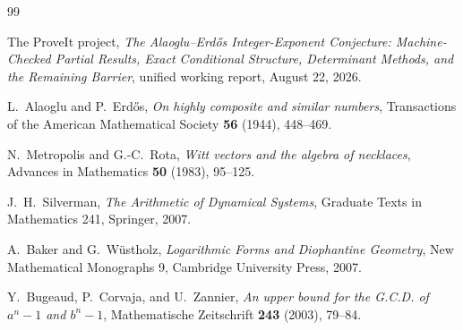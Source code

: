 \documentclass[11pt,oneside]{article}
\theoremstyle{definition}
\theoremstyle{remark}
\begin{document}
\begin{thebibliography}{99}

The ProveIt project,
\newblock \emph{The Alaoglu--Erd\H{o}s Integer-Exponent Conjecture: Machine-Checked Partial
Results, Exact Conditional Structure, Determinant Methods, and the Remaining Barrier},
\newblock unified working report, August 22, 2026.

L.~Alaoglu and P.~Erd\H{o}s,
\newblock \emph{On highly composite and similar numbers},
\newblock Transactions of the American Mathematical Society \textbf{56} (1944), 448--469.

N.~Metropolis and G.-C.~Rota,
\newblock \emph{Witt vectors and the algebra of necklaces},
\newblock Advances in Mathematics \textbf{50} (1983), 95--125.

J.~H.~Silverman,
\newblock \emph{The Arithmetic of Dynamical Systems},
\newblock Graduate Texts in Mathematics 241, Springer, 2007.

A.~Baker and G.~W\"ustholz,
\newblock \emph{Logarithmic Forms and Diophantine Geometry},
\newblock New Mathematical Monographs 9, Cambridge University Press, 2007.

Y.~Bugeaud, P.~Corvaja, and U.~Zannier,
\newblock \emph{An upper bound for the G.C.D. of \(a^n-1\) and \(b^n-1\)},
\newblock Mathematische Zeitschrift \textbf{243} (2003), 79--84.

\end{thebibliography}
\end{document}
